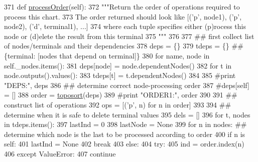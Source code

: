 \begin{DoxyCode}
371     \textcolor{keyword}{def }\hyperlink{classFlowchart_1_1Flowchart_a93e115629a83742fb6e56a097b9933aa}{processOrder}(self):
372         \textcolor{stringliteral}{"""Return the order of operations required to process this chart.}
373 \textcolor{stringliteral}{        The order returned should look like [('p', node1), ('p', node2), ('d', terminal1), ...] }
374 \textcolor{stringliteral}{        where each tuple specifies either (p)rocess this node or (d)elete the result from this terminal}
375 \textcolor{stringliteral}{        """}
376         
377         \textcolor{comment}{## first collect list of nodes/terminals and their dependencies}
378         deps = \{\}
379         tdeps = \{\}   \textcolor{comment}{## \{terminal: [nodes that depend on terminal]\}}
380         \textcolor{keywordflow}{for} name, node \textcolor{keywordflow}{in} self.\_nodes.items():
381             deps[node] = node.dependentNodes()
382             \textcolor{keywordflow}{for} t \textcolor{keywordflow}{in} node.outputs().values():
383                 tdeps[t] = t.dependentNodes()
384             
385         \textcolor{comment}{#print "DEPS:", deps}
386         \textcolor{comment}{## determine correct node-processing order}
387         \textcolor{comment}{#deps[self] = []}
388         order = \hyperlink{namespaceFlowchart_a3a8dec1a56afa0fb5e704625606501b6}{toposort}(deps)
389         \textcolor{comment}{#print "ORDER1:", order}
390         
391         \textcolor{comment}{## construct list of operations}
392         ops = [(\textcolor{stringliteral}{'p'}, n) \textcolor{keywordflow}{for} n \textcolor{keywordflow}{in} order]
393         
394         \textcolor{comment}{## determine when it is safe to delete terminal values}
395         dels = []
396         \textcolor{keywordflow}{for} t, nodes \textcolor{keywordflow}{in} tdeps.items():
397             lastInd = 0
398             lastNode = \textcolor{keywordtype}{None}
399             \textcolor{keywordflow}{for} n \textcolor{keywordflow}{in} nodes:  \textcolor{comment}{## determine which node is the last to be processed according to order}
400                 \textcolor{keywordflow}{if} n \textcolor{keywordflow}{is} self:
401                     lastInd = \textcolor{keywordtype}{None}
402                     \textcolor{keywordflow}{break}
403                 \textcolor{keywordflow}{else}:
404                     \textcolor{keywordflow}{try}:
405                         ind = order.index(n)
406                     \textcolor{keywordflow}{except} ValueError:
407                         \textcolor{keywordflow}{continue}

\end{DoxyCode}
